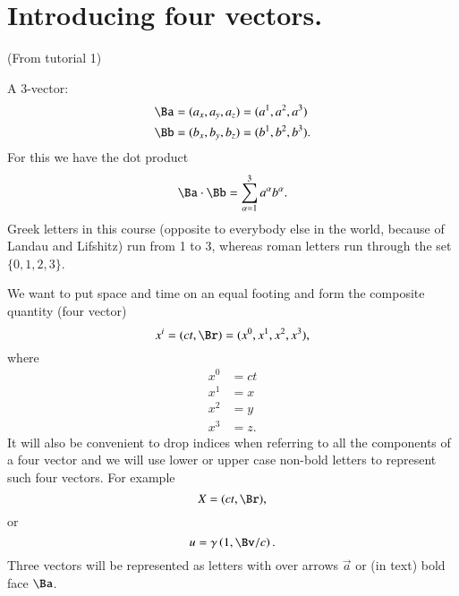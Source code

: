 %
%
\section{Introducing four vectors.}

(From tutorial 1)

A 3-vector:
%
\begin{equation}\label{eqn:relativisticElectrodynamicsT1:10}
\begin{aligned}
\Ba &= (a_x, a_y, a_z) = (a^1, a^2, a^3) \\
\Bb &= (b_x, b_y, b_z) = (b^1, b^2, b^3).
\end{aligned}
\end{equation}
%
For this we have the dot product
\begin{equation}\label{eqn:relativisticElectrodynamicsT1:20}
\Ba \cdot \Bb = \sum_{\alpha=1}^3 a^\alpha b^\alpha.
\end{equation}
%
Greek letters in this course (opposite to everybody else in the world, because of Landau and Lifshitz) run from 1 to 3, whereas roman letters run through the set \(\{0,1,2,3\}\).

We want to put space and time on an equal footing and form the composite quantity (four vector)
\begin{equation}\label{eqn:relativisticElectrodynamicsT1:40}
x^i = (ct, \Br) = (x^0, x^1, x^2, x^3),
\end{equation}
where
\begin{equation}\label{eqn:relativisticElectrodynamicsT1:80}
\begin{aligned}
x^0 &= ct \\
x^1 &= x \\
x^2 &= y \\
x^3 &= z.
\end{aligned}
\end{equation}
%
It will also be convenient to drop indices when referring to all the components of a four vector and we will use lower or upper case non-bold letters to represent such four vectors.  For example
%
\begin{equation}\label{eqn:relativisticElectrodynamicsT1:81}
X = (ct, \Br),
\end{equation}
or
\begin{equation}\label{eqn:relativisticElectrodynamicsT1:82}
u = \gamma \left(1, \Bv/c \right).
\end{equation}
%
Three vectors will be represented as letters with over arrows \(\vec{a}\) or (in text) bold face \(\Ba\).

